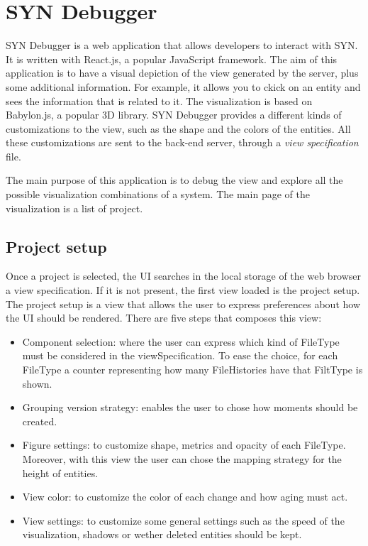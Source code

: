 \section{SYN Debugger}

SYN Debugger is a web application that allows developers to interact with SYN. It is written with React.js, a popular JavaScript framework. 
The aim of this application is to have a visual depiction of the view generated by the server, plus some additional information. 
For example, it allows you to ckick on an entity and sees the information that is related to it. 
The visualization is based on Babylon.js, a popular 3D library. 
SYN Debugger provides a different kinds of customizations to the view, such as the shape and the colors of the entities. 
All these customizations are sent to the back-end server, through a {\em view specification} file. 

The main purpose of this application is to debug the view and explore all the possible visualization combinations of a system.
The main page of the visualization is a list of project.

\subsection*{Project setup}
Once a project is selected, the UI searches in the local storage of the web browser a view specification. 
If it is not present, the first view loaded is the project setup.
The project setup is a view that allows the user to express preferences about how the UI should be rendered. 
There are five steps that composes this view:
\begin{itemize}
    \item Component selection: where the user can express which kind of FileType must be considered in the viewSpecification. 
    To ease the choice, for each FileType a counter representing how many FileHistories have that FiltType is shown. 
    \item Grouping version strategy: enables the user to chose how moments should be created.
    \item Figure settings: to customize shape, metrics and opacity of each FileType. Moreover, with this view the user can chose the mapping strategy for the height of entities. 
    \item View color: to customize the color of each change and how aging must act. 
    \item View settings: to customize some general settings such as the speed of the visualization, shadows or wether deleted entities should be kept. 
\end{itemize}

